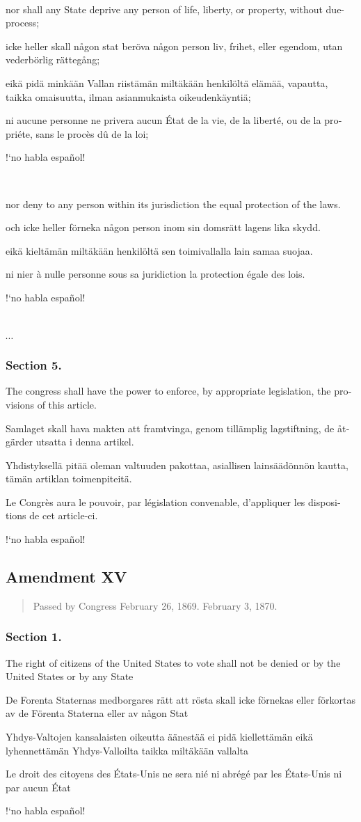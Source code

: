 \documentclass[a4paper,landscape,10pt]{article}
\newcommand{\tblock}[5]{\noindent\begin{minipage}[t]{0.18\textwidth}\foreignlanguage{english}{#1}\end{minipage}\hskip 0.025\textwidth\begin{minipage}[t]{0.18\textwidth}\foreignlanguage{swedish}{#2}\end{minipage}\hskip 0.025\textwidth\begin{minipage}[t]{0.18\textwidth}\foreignlanguage{finnish}{#3}\end{minipage}\hskip 0.025\textwidth\begin{minipage}[t]{0.18\textwidth}\foreignlanguage{french}{#4}\end{minipage}\hskip 0.025\textwidth\begin{minipage}[t]{0.18\textwidth}\foreignlanguage{spanish}{#5}\end{minipage}}
\begin{document}
~

\tblock
{nor shall any State deprive any person of life, liberty, or property, without \gls{due-process};}
{icke heller skall någon stat beröva någon person liv, frihet, eller egendom, utan vederbörlig rättegång;}
{eikä pidä minkään Vallan riistämän miltäkään henkilöltä elämää, vapautta, taikka omaisuutta, ilman asianmukaista oikeudenkäyntiä;}
{ni aucune personne ne privera aucun État de la vie, de la liberté, ou de la propriéte, sans le procès dû de la loi;}
{!`no habla español!}

	
~

\tblock
{nor deny to any person within its jurisdiction the equal protection of the laws.}
{och icke heller förneka någon person inom sin domsrätt lagens lika skydd.}
{eikä kieltämän miltäkään henkilöltä sen toimivallalla lain samaa suojaa.}
{ni nier à nulle personne sous sa juridiction la protection égale des lois.}
{!`no habla español!}

~
		
$\cdots$

\subsubsection*{Section 5.}
\tblock
{The \Gls{congress} shall have the power to enforce, by appropriate legislation, the provisions of this article.}
{Samlaget skall hava makten att framtvinga, genom tillämplig lagstiftning, de åtgärder utsatta i denna artikel.}
{Yhdistyksellä pitää oleman valtuuden pakottaa, asiallisen lainsäädönnön kautta, tämän artiklan toimenpiteitä.}
{Le Congrès aura le pouvoir, par législation convenable, d'appliquer les dispositions de cet article-ci.}
{!`no habla español!}


\subsection*{Amendment XV}
\begin{quote}\small
	Passed by Congress February 26, 1869.  February 3, 1870.
\end{quote}

\subsubsection*{Section 1.}
\tblock
{The right of citizens of the United States to vote shall not be denied or \glsdisp{abridge}{abridged} by the United States or by any State}
{De Forenta Staternas medborgares rätt att rösta skall icke förnekas eller förkortas av de Förenta Staterna eller av någon Stat}
{Yhdys-Valtojen kansalaisten oikeutta äänestää ei pidä kiellettämän eikä lyhennettämän Yhdys-Valloilta taikka miltäkään vallalta}
{Le droit des citoyens des États-Unis ne sera nié ni abrégé par les États-Unis ni par aucun État}
{!`no habla español!}
\end{document}
